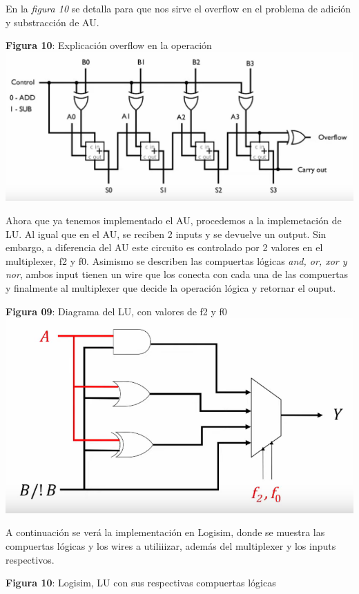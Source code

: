 \documentclass[11pt]{article}
\begin{document}
\begin{question}
{\begin{center}
	\end{center}
	En la \emph{figura 10} se detalla para que nos sirve el overflow en el problema de adición y substracción de AU.
	\begin{center} \textbf{Figura 10}: Explicación overflow en la operación
		\includegraphics[scale=0.4]{IMAGES_14}
	\end{center}
	Ahora que ya tenemos implementado el AU, procedemos a la implemetación de LU. Al igual que en el AU, se reciben 2 inputs y se devuelve un output. Sin embargo, a diferencia del AU este circuito es controlado por 2 valores en el multiplexer, f2 y f0. Asimismo se describen las compuertas lógicas \textit{and, or, xor y nor}, ambos input tienen un wire que los conecta con cada una de las compuertas y finalmente al multiplexer que decide la operación lógica y retornar el ouput.
	\begin{center} \textbf{Figura 09}: Diagrama del LU, con valores de f2 y f0
		\includegraphics[scale=0.3]{IMAGES_09}
	\end{center}
	A continuación se verá la implementación en Logisim, donde se muestra las compuertas lógicas y los wires a utiliiizar, además del multiplexer y los inputs respectivos.
	\begin{center} \textbf{Figura 10}: Logisim, LU con sus respectivas compuertas lógicas

\end{center}}
\end{question}
\end{document}
